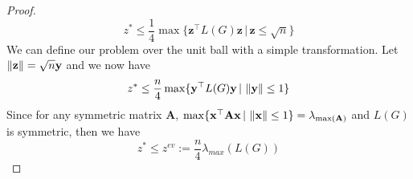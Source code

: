 \documentclass[12pt]{article}
\theoremstyle{plain}
\theoremstyle{definition}
\begin{document}
\begin{proof}
\begin{equation}
z^* \leq \frac{1}{4} \max \lbrace \mathbf{z}^\top L(G) \mathbf{z} \,|\, \mathbf{z} \leq \sqrt{n} \rbrace
\end{equation}    
We can define our problem over the unit ball with a simple transformation. Let $\left\lVert\mathbf{z}\right\rVert = \sqrt{n} \mathbf{y}$ and
we now have
\begin{equation}
    z^* \leq \frac{n}{4} \max \lbrace \mathbf{y}^\top L(G) \mathbf{y} \,|\, \left\lVert\mathbf{y}\right\rVert \leq 1 \rbrace
\end{equation}  
Since for any symmetric matrix $\mathbf{A}$, $\max\lbrace \mathbf{x}^\top \mathbf{A} \mathbf{x}\,|\, \left\lVert\mathbf{x}\right\rVert \leq 1 \rbrace = \lambda_{\max(\mathbf{A})}$ 
and $L(G)$ is symmetric, then we have 
\begin{equation}
z^* \leq z^{ev} := \dfrac{n}{4} \lambda_{max}(L(G))
\end{equation}

\end{proof}
\end{document}
